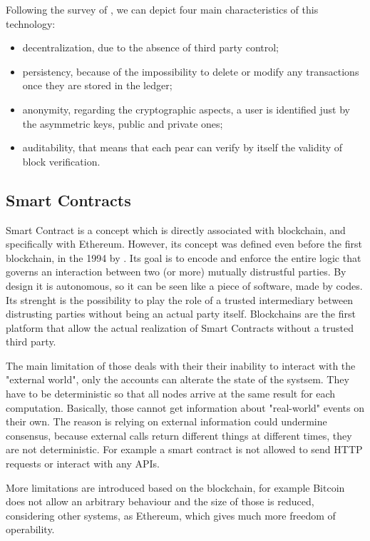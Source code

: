 Following the survey of \citet{BlockChain1}, we can depict four main characteristics of this technology:
\begin{itemize}
    \item decentralization, due to the absence of third party control;
    \item persistency, because of the impossibility to delete or modify any transactions once they are stored in the ledger;
    \item anonymity, regarding the cryptographic aspects, a user is identified just by the asymmetric keys, public and private ones;    
    \item auditability, that means that each pear can verify by itself the validity of block verification.
\end{itemize}


\subsection{Smart Contracts}

Smart Contract is a concept which is directly associated with blockchain, and specifically with Ethereum.
However, its concept was defined even before the first blockchain, in the 1994 by \citet{SmartContractDef}.
Its goal is to encode and enforce the entire logic that governs an interaction
between two (or more) mutually distrustful parties. By design it is autonomous, so it can be seen like a piece of software, made by codes.
Its strenght is the possibility to play the role of a trusted intermediary between distrusting parties
without being an actual party itself.
Blockchains are the first platform that allow the actual realization of
Smart Contracts without a trusted third party. 

The main limitation of those deals with their their inability to interact with the "external world", 
only the accounts can alterate the state of the systsem. 
They have to be deterministic so that all nodes arrive at the same result for each computation. 
Basically, those cannot get information about "real-world" events on their own. 
The reason is relying on external information could undermine consensus, 
because external calls return different things at different times, they are not deterministic.
For example a smart contract is not allowed to send HTTP requests or interact with any APIs.

More limitations are introduced based on the blockchain, for example Bitcoin does not allow an arbitrary behaviour and the size of those is reduced, 
considering other systems, as Ethereum, which gives much more freedom of operability.

